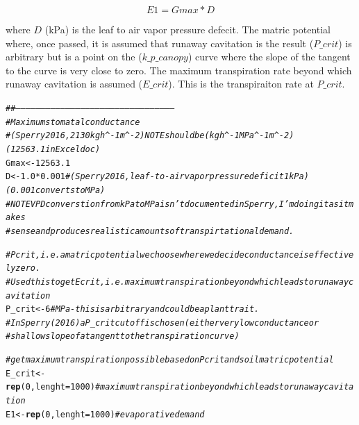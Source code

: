 \documentclass[a4paper]{article}\usepackage[]{graphicx}\usepackage[]{color}
\makeatletter
\newcommand{\hlnum}[1]{\textcolor[rgb]{0.686,0.059,0.569}{#1}}%
\newcommand{\hlcom}[1]{\textcolor[rgb]{0.678,0.584,0.686}{\textit{#1}}}%
\newcommand{\hlopt}[1]{\textcolor[rgb]{0,0,0}{#1}}%
\newcommand{\hlstd}[1]{\textcolor[rgb]{0.345,0.345,0.345}{#1}}%
\newcommand{\hlkwb}[1]{\textcolor[rgb]{0.69,0.353,0.396}{#1}}%
\newcommand{\hlkwc}[1]{\textcolor[rgb]{0.333,0.667,0.333}{#1}}%
\newcommand{\hlkwd}[1]{\textcolor[rgb]{0.737,0.353,0.396}{\textbf{#1}}}%
\newenvironment{kframe}{%
 \def\at@end@of@kframe{}%
 \ifinner\ifhmode%
  \def\at@end@of@kframe{\end{minipage}}%
  \begin{minipage}{\columnwidth}%
 \fi\fi%
 \def\FrameCommand##1{\hskip\@totalleftmargin \hskip-\fboxsep
 \colorbox{shadecolor}{##1}\hskip-\fboxsep
     \hskip-\linewidth \hskip-\@totalleftmargin \hskip\columnwidth}%
 \MakeFramed {\advance\hsize-\width
   \@totalleftmargin\z@ \linewidth\hsize
   \@setminipage}}%
 {\par\unskip\endMakeFramed%
 \at@end@of@kframe}
\newenvironment{knitrout}{}{} %
\makeatother
\begin{document}
\begin{equation}
E1 = Gmax * D
\end{equation}

\noindent where $D$ (kPa) is the leaf to air vapor pressure defecit. The matric potential where, once passed, it is assumed that runaway cavitation is the result ($P\_crit$) is arbitrary but is a point on the ($k\_p\_canopy$) curve where the slope of the tangent to the curve is very close to zero. The maximum transpiration rate beyond which runaway cavitation is assumed ($E\_crit$). This is the transpiraiton rate at $P\_crit$.   
\begin{knitrout}
\color{fgcolor}\begin{kframe}
\begin{alltt}
\hlcom{##-----------------------------------------------------------------------------------------------}
\hlcom{# Maximum stomatal conductance}
\hlcom{# (Sperry 2016, 2130 kg h^-1 m^-2) NOTE should be (kg h^-1 MPa^-1 m^-2) (12563.1 in Excel doc)}
\hlstd{Gmax} \hlkwb{<-} \hlnum{12563.1}
\hlstd{D} \hlkwb{<-} \hlnum{1.0}\hlopt{*}\hlnum{0.001} \hlcom{#(Sperry 2016, leaf-to-air vapor pressure deficit 1 kPa)(0.001 converts to MPa) }
\hlcom{# NOTE VPD converstion from kPa to MPa isn't documented in Sperry, I'm doing it as it makes }
\hlcom{# sense and produces realistic amounts of transpirtational demand. }

\hlcom{# Pcrit, i.e. a matric potential we choose where we decide conductance is effectively zero. }
\hlcom{# Used this to get Ecrit, i.e. maximum transpiration beyond which leads to runaway cavitation  }
\hlstd{P_crit} \hlkwb{<-} \hlnum{6} \hlcom{# MPa - this is arbitrary and could be a plant trait. }
\hlcom{# In Sperry (2016) a P_crit cutoff is chosen (either very low conductance or }
\hlcom{# shallow slope of a tangent to the transpiration curve)}

\hlcom{# get maximum transpiration possible based on Pcrit and soil matric potential }
\hlstd{E_crit} \hlkwb{<-} \hlkwd{rep}\hlstd{(}\hlnum{0}\hlstd{,} \hlkwc{lenght}\hlstd{=}\hlnum{1000}\hlstd{)} \hlcom{# maximum transpiration beyond which leads to runaway cavitation}
\hlstd{E1} \hlkwb{<-} \hlkwd{rep}\hlstd{(}\hlnum{0}\hlstd{,} \hlkwc{lenght}\hlstd{=}\hlnum{1000}\hlstd{)} \hlcom{# evaporative demand}
\end{alltt}
\end{kframe}
\end{knitrout}
\end{document}
